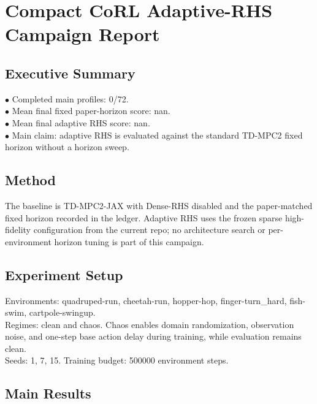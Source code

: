 \documentclass{article}
\begin{document}
\section*{Compact CoRL Adaptive-RHS Campaign Report}

\subsection*{Executive Summary}

\noindent $\bullet$ Completed main profiles: 0/72.\\
\noindent $\bullet$ Mean final fixed paper-horizon score: nan.\\
\noindent $\bullet$ Mean final adaptive RHS score: nan.\\
\noindent $\bullet$ Main claim: adaptive RHS is evaluated against the standard TD-MPC2 fixed horizon without a horizon sweep.\\

\subsection*{Method}

The baseline is TD-MPC2-JAX with Dense-RHS disabled and the paper-matched fixed horizon recorded in the ledger. Adaptive RHS uses the frozen sparse high-fidelity configuration from the current repo; no architecture search or per-environment horizon tuning is part of this campaign.\\

\subsection*{Experiment Setup}

Environments: quadruped-run, cheetah-run, hopper-hop, finger-turn\_hard, fish-swim, cartpole-swingup.\\

Regimes: clean and chaos. Chaos enables domain randomization, observation noise, and one-step base action delay during training, while evaluation remains clean.\\

Seeds: 1, 7, 15. Training budget: 500000 environment steps.\\

\subsection*{Main Results}
\end{document}
